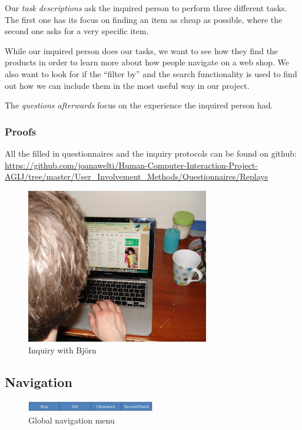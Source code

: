 Our \textit{task descriptions} ask the inquired person to perform three different tasks. The first one has its focus on finding an item as cheap as possible, where the second one asks for a very specific item. 

While our inquired person does our tasks, we want to see how they find the products in order to learn more about how people navigate on a web shop. We also want to look for if the ``filter by'' and the search functionality is used to find out how we can include them in the most useful way in our project. 
 
The \textit{questions afterwards} focus on the experience the inquired person had.

\subsubsection{Proofs}
All the filled in questionnaires and the inquiry protocols can be found on github:
\url{https://github.com/joanawelti/Human-Computer-Interaction-Project-AGIJ/tree/master/User_Involvement_Methods/Questionnaires/Replays}

\begin{figure}[H]
\centering
\includegraphics[width=8cm]{Images/inquiry_bjoern.JPG}
\caption{Inquiry with Bj\"orn}
\label{fig:inquiry_bjoern}
\end{figure}


\subsection{Navigation}
\begin{figure}[H]
  \centering  
  \includegraphics[width=0.5\textwidth]{Images/globalMenu.jpg}                
  \caption{Global navigation menu}
  \label{fig:globalMenu}
\end{figure}

